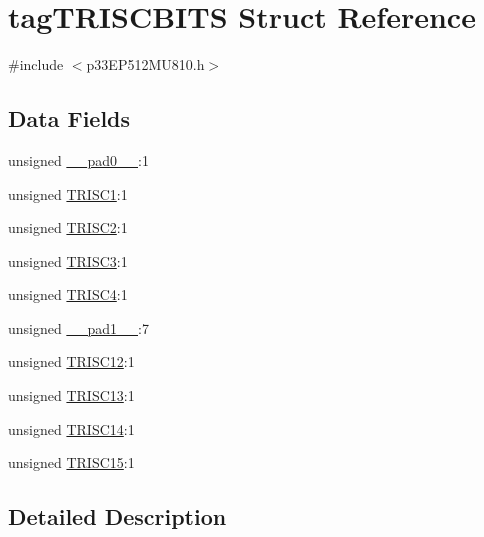 \hypertarget{structtag_t_r_i_s_c_b_i_t_s}{}\section{tag\+T\+R\+I\+S\+C\+B\+I\+TS Struct Reference}
\label{structtag_t_r_i_s_c_b_i_t_s}


{\ttfamily \#include $<$p33\+E\+P512\+M\+U810.\+h$>$}

\subsection*{Data Fields}
\begin{DoxyCompactItemize}
\item 
unsigned \hyperlink{structtag_t_r_i_s_c_b_i_t_s_adf71f3d8410c1f1dbbc96680a92c49af}{\+\_\+\+\_\+pad0\+\_\+\+\_\+}\+:1
\item 
unsigned \hyperlink{structtag_t_r_i_s_c_b_i_t_s_a1cc7a32e03a796eb4d05b85efe07ac2d}{T\+R\+I\+S\+C1}\+:1
\item 
unsigned \hyperlink{structtag_t_r_i_s_c_b_i_t_s_abd9996ec4b93a5c2879a5a305b2ddc32}{T\+R\+I\+S\+C2}\+:1
\item 
unsigned \hyperlink{structtag_t_r_i_s_c_b_i_t_s_a327dc42ea095c5655864fd2b5f23a6a6}{T\+R\+I\+S\+C3}\+:1
\item 
unsigned \hyperlink{structtag_t_r_i_s_c_b_i_t_s_af274ba23f40e654e5d022a3601a16389}{T\+R\+I\+S\+C4}\+:1
\item 
unsigned \hyperlink{structtag_t_r_i_s_c_b_i_t_s_acaf2d0924a107ec6e8d2e31febaf66f9}{\+\_\+\+\_\+pad1\+\_\+\+\_\+}\+:7
\item 
unsigned \hyperlink{structtag_t_r_i_s_c_b_i_t_s_a4dcd7fbd13a54abf40b6e5507bb6d7cd}{T\+R\+I\+S\+C12}\+:1
\item 
unsigned \hyperlink{structtag_t_r_i_s_c_b_i_t_s_a28c2f412b47ad648dfe8bdac0f77c479}{T\+R\+I\+S\+C13}\+:1
\item 
unsigned \hyperlink{structtag_t_r_i_s_c_b_i_t_s_ab88816f099e2b8eddf55fb0cc711b5a6}{T\+R\+I\+S\+C14}\+:1
\item 
unsigned \hyperlink{structtag_t_r_i_s_c_b_i_t_s_a464424fb6a98ca4b85d646f0a0530891}{T\+R\+I\+S\+C15}\+:1
\end{DoxyCompactItemize}


\subsection{Detailed Description}


